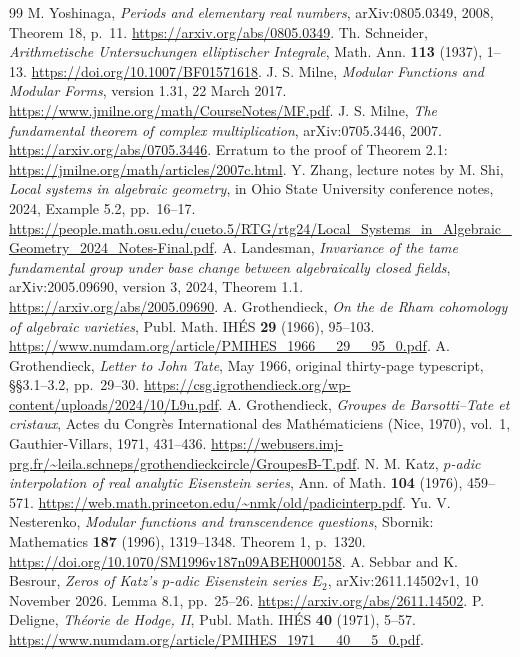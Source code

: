 \documentclass[11pt]{article}
\theoremstyle{definition}\newtheorem{definition}[theorem]{Definition}
\theoremstyle{remark}\newtheorem{remark}[theorem]{Remark}
\begin{document}
\begin{thebibliography}{99}
 M. Yoshinaga, \emph{Periods and elementary real numbers}, arXiv:0805.0349, 2008, Theorem 18, p.~11. \url{https://arxiv.org/abs/0805.0349}.
 Th. Schneider, \emph{Arithmetische Untersuchungen elliptischer Integrale}, Math. Ann. \textbf{113} (1937), 1--13. \url{https://doi.org/10.1007/BF01571618}.
 J. S. Milne, \emph{Modular Functions and Modular Forms}, version 1.31, 22 March 2017. \url{https://www.jmilne.org/math/CourseNotes/MF.pdf}.
 J. S. Milne, \emph{The fundamental theorem of complex multiplication}, arXiv:0705.3446, 2007. \url{https://arxiv.org/abs/0705.3446}. Erratum to the proof of Theorem 2.1: \url{https://jmilne.org/math/articles/2007c.html}.
 Y. Zhang, lecture notes by M. Shi, \emph{Local systems in algebraic geometry}, in Ohio State University conference notes, 2024, Example 5.2, pp.~16--17. \url{https://people.math.osu.edu/cueto.5/RTG/rtg24/Local_Systems_in_Algebraic_Geometry_2024_Notes-Final.pdf}.
 A. Landesman, \emph{Invariance of the tame fundamental group under base change between algebraically closed fields}, arXiv:2005.09690, version 3, 2024, Theorem 1.1. \url{https://arxiv.org/abs/2005.09690}.
 A. Grothendieck, \emph{On the de Rham cohomology of algebraic varieties}, Publ. Math. IH\'ES \textbf{29} (1966), 95--103. \url{https://www.numdam.org/article/PMIHES_1966__29__95_0.pdf}.
 A. Grothendieck, \emph{Letter to John Tate}, May 1966, original thirty-page typescript, \S\S3.1--3.2, pp.~29--30. \url{https://csg.igrothendieck.org/wp-content/uploads/2024/10/L9u.pdf}.
 A. Grothendieck, \emph{Groupes de Barsotti--Tate et cristaux}, Actes du Congr\`es International des Math\'ematiciens (Nice, 1970), vol.~1, Gauthier-Villars, 1971, 431--436. \url{https://webusers.imj-prg.fr/~leila.schneps/grothendieckcircle/GroupesB-T.pdf}.
 N. M. Katz, \emph{$p$-adic interpolation of real analytic Eisenstein series}, Ann. of Math. \textbf{104} (1976), 459--571. \url{https://web.math.princeton.edu/~nmk/old/padicinterp.pdf}.
 Yu. V. Nesterenko, \emph{Modular functions and transcendence questions}, Sbornik: Mathematics \textbf{187} (1996), 1319--1348. Theorem 1, p.~1320. \url{https://doi.org/10.1070/SM1996v187n09ABEH000158}.
 A. Sebbar and K. Besrour, \emph{Zeros of Katz's $p$-adic Eisenstein series $E_2$}, arXiv:2611.14502v1, 10 November 2026. Lemma 8.1, pp.~25--26. \url{https://arxiv.org/abs/2611.14502}.
 P. Deligne, \emph{Th\'eorie de Hodge, II}, Publ. Math. IH\'ES \textbf{40} (1971), 5--57. \url{https://www.numdam.org/article/PMIHES_1971__40__5_0.pdf}.

\end{thebibliography}
\end{document}
